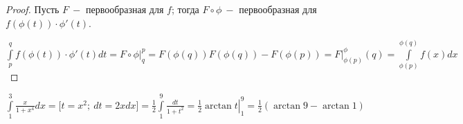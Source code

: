 \begin{proof}
    Пусть $F\ -$ первообразная для $f$; тогда $F\circ \phi \ -$ первообразная для $f(\phi(t))\cdot \phi'(t)$.

    $\int\limits_p^q f(\phi(t))\cdot \phi '(t)dt=\left.F\circ \phi\right|_q^p=F(\phi(q))F(\phi(q))-F(\phi(p))=\left. F\right|_{\phi(p)}^\phi(q)=\int\limits_{\phi(p)}^{\phi(q)}f(x)dx$
\end{proof}

\begin{example}
    $\int\limits_1^3\frac{x}{1+x^4}dx=\bigg[ t=x^2;\ dt=2xdx\bigg]=\frac{1}{2}\int\limits_1^9 \frac{dt}{1+t^2}=\left.\frac{1}{2}\arctan t\right|_1^9=\frac{1}{2}(\arctan 9 - \arctan 1)$
\end{example}
